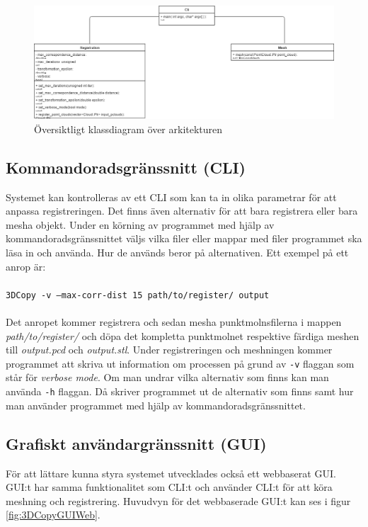 \begin{figure}[H]
	\centering
	\includegraphics[width=130mm]{figures/klassdiagram.png}
	\caption{Översiktligt klassdiagram över arkitekturen}
	\label{fig:class_diagram}
\end{figure}

\subsection{Kommandoradsgränssnitt (CLI)}

Systemet kan kontrolleras av ett CLI som kan ta in olika parametrar för att anpassa registreringen. Det finns även alternativ för att bara registrera eller bara mesha objekt. Under en körning av programmet med hjälp av kommandoradsgränssnittet väljs vilka filer eller mappar med filer programmet ska läsa in och använda. Hur de används beror på alternativen. Ett exempel på ett anrop är:\\\\
\texttt{3DCopy -v --max-corr-dist 15 path/to/register/ output}\\\\
Det anropet kommer registrera och sedan mesha punktmolnsfilerna i mappen \textit{path/to/register/} och döpa det kompletta punktmolnet respektive färdiga meshen till \textit{output.pcd} och \textit{output.stl}. Under registreringen och meshningen kommer programmet att skriva ut information om processen på grund av \texttt{-v} flaggan som står för \textit{verbose mode}. Om man undrar vilka alternativ som finns kan man använda \texttt{-h} flaggan. Då skriver programmet ut de alternativ som finns samt hur man använder programmet med hjälp av kommandoradsgränssnittet. 

\subsection{Grafiskt användargränssnitt (GUI)}
För att lättare kunna styra systemet utvecklades också ett webbaserat GUI. GUI:t har samma funktionalitet som CLI:t och använder CLI:t för att köra meshning och registrering. Huvudvyn för det webbaserade GUI:t kan ses i figur \ref{fig:3DCopyGUIWeb}. 

